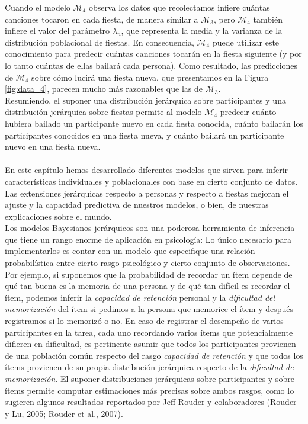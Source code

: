 \documentclass{article}
\begin{document}
\indent	Cuando el modelo $\mathcal M_4$ observa los datos que recolectamos infiere cuántas canciones tocaron en cada fiesta, de manera similar a $\mathcal M_3$, pero $\mathcal M_4$ también infiere el valor del parámetro $\lambda_n$, que representa la media y la varianza de la distribución poblacional de fiestas. En consecuencia, $\mathcal M_4$ puede utilizar este conocimiento para predecir cuántas canciones tocarán en la fiesta siguiente (y por lo tanto cuántas de ellas bailará cada persona). Como resultado, las predicciones de $\mathcal M_4$ sobre cómo lucirá una fiesta nueva, que presentamos en la Figura \ref{fig:data_4}, parecen mucho más razonables que las de $\mathcal M_3$.\\
\indent Resumiendo, el suponer una distribución jerárquica sobre participantes y una distribución jerárquica sobre fiestas permite al modelo $\mathcal M_4$ predecir cuánto hubiera bailado un participante nuevo en cada fiesta conocida, cuánto bailarán los participantes conocidos en una fiesta nueva, y cuánto bailará un participante nuevo en una fiesta nueva. \\\\
\indent En este capítulo hemos desarrollado diferentes modelos que sirven para inferir características individuales y poblacionales con base en cierto conjunto de datos. Las extensiones jerárquicas respecto a personas y respecto a fiestas mejoran el ajuste y la capacidad predictiva de nuestros modelos, o bien, de nuestras explicaciones sobre el mundo.\\
\indent Los modelos Bayesianos jerárquicos son una poderosa herramienta de inferencia que tiene un rango enorme de aplicación en psicología: Lo único necesario para implementarlos es contar con un modelo que especifique una relación probabilística entre cierto rasgo psicológico y cierto conjunto de observaciones. Por ejemplo, si suponemos que la probabilidad de recordar un ítem depende de qué tan buena es la memoria de una persona y de qué tan difícil es recordar el ítem, podemos inferir la \emph{capacidad de retención} personal y la \emph{dificultad del memorización} del ítem si pedimos a la persona que memorice el ítem y después registramos si lo memorizó o no. En caso de registrar el desempeño de varios participantes en la tarea, cada uno recordando varios ítems que potencialmente difieren en dificultad, es pertinente asumir que todos los participantes provienen de una población común respecto del rasgo \emph{capacidad de retención} y que todos los ítems provienen de su propia distribución jerárquica respecto de la \emph{dificultad de memorización}. El suponer distribuciones jerárquicas sobre participantes y sobre ítems permite computar estimaciones más precisas sobre ambos rasgos, como lo sugieren algunos resultados reportados por Jeff Rouder y colaboradores (Rouder y Lu, 2005; Rouder et al., 2007). 
\end{document}
